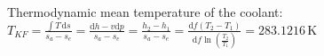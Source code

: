 Thermodynamic mean temperature of the coolant:  
\( T_{KF} = \frac{\int T \, \text{d}s}{s_a - s_e} = \frac{\text{d}h - v \text{d}p}{s_a - s_e} = \frac{h_2 - h_1}{s_a - s_e} = \frac{\text{d}f(T_2 - T_1)}{\text{d}f \ln \left( \frac{T_2}{T_1} \right)} = 283.1216 \, \text{K} \)